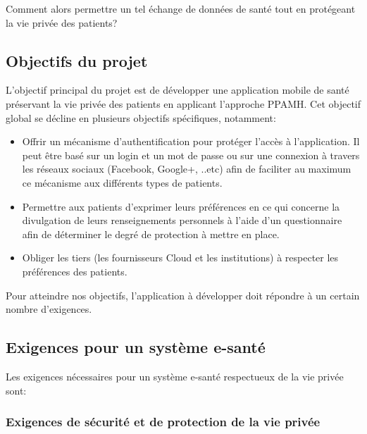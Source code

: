 \vspace{6pt}
\paragraphmark

Comment alors permettre un tel échange de données de santé tout en protégeant la vie privée des patients? 

\subsection{Objectifs du projet}

L'objectif principal du projet est de développer une application mobile de santé préservant la vie privée des patients en applicant l'approche PPAMH. Cet objectif global se décline en plusieurs objectifs spécifiques, notamment:

\vspace{6pt}
\paragraphmark

\begin{itemize}
	\item Offrir un mécanisme d'authentification pour protéger l'accès à l'application. Il peut être basé sur un login et un mot de passe ou sur une connexion à travers les réseaux sociaux (Facebook, Google+, ..etc) afin de faciliter au maximum ce mécanisme aux différents types de patients.
	\item Permettre aux patients d'exprimer leurs préférences en ce qui concerne la divulgation de leurs renseignements personnels à l'aide d'un questionnaire afin de déterminer le degré de protection à mettre en place.
	\item Obliger les tiers (les fournisseurs Cloud et les institutions) à respecter les préférences des patients.
\end{itemize}

\vspace{6pt}
\paragraphmark

Pour atteindre nos objectifs, l'application à développer doit répondre à un certain nombre d'exigences.

\subsection{Exigences pour un système e-santé}

Les exigences nécessaires pour un système e-santé respectueux de la vie privée sont:

\subsubsection{Exigences de sécurité et de protection de la vie privée}

